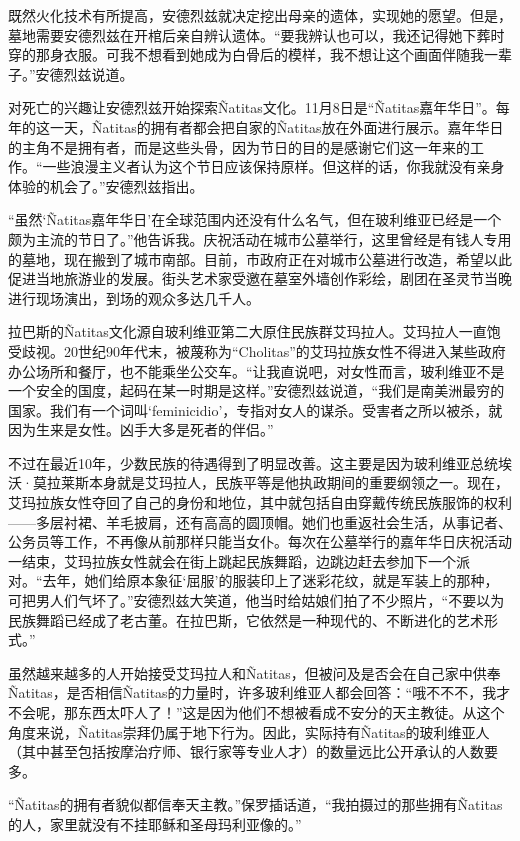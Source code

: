 \documentclass[12pt,oneside]{book}
\begin{document}
\begin{bookref}[frametitle={\cite{好好告别}}]
既然火化技术有所提高，安德烈兹就决定挖出母亲的遗体，实现她的愿望。但是，墓地需要安德烈兹在开棺后亲自辨认遗体。“要我辨认也可以，我还记得她下葬时穿的那身衣服。可我不想看到她成为白骨后的模样，我不想让这个画面伴随我一辈子。”安德烈兹说道。

对死亡的兴趣让安德烈兹开始探索Ñatitas文化。11月8日是“Ñatitas嘉年华日”。每年的这一天，Ñatitas的拥有者都会把自家的Ñatitas放在外面进行展示。嘉年华日的主角不是拥有者，而是这些头骨，因为节日的目的是感谢它们这一年来的工作。“一些浪漫主义者认为这个节日应该保持原样。但这样的话，你我就没有亲身体验的机会了。”安德烈兹指出。

“虽然‘Ñatitas嘉年华日’在全球范围内还没有什么名气，但在玻利维亚已经是一个颇为主流的节日了。”他告诉我。庆祝活动在城市公墓举行，这里曾经是有钱人专用的墓地，现在搬到了城市南部。目前，市政府正在对城市公墓进行改造，希望以此促进当地旅游业的发展。街头艺术家受邀在墓室外墙创作彩绘，剧团在圣灵节当晚进行现场演出，到场的观众多达几千人。

拉巴斯的Ñatitas文化源自玻利维亚第二大原住民族群艾玛拉人。艾玛拉人一直饱受歧视。20世纪90年代末，被蔑称为“Cholitas”的艾玛拉族女性不得进入某些政府办公场所和餐厅，也不能乘坐公交车。“让我直说吧，对女性而言，玻利维亚不是一个安全的国度，起码在某一时期是这样。”安德烈兹说道，“我们是南美洲最穷的国家。我们有一个词叫‘feminicidio’，专指对女人的谋杀。受害者之所以被杀，就因为生来是女性。凶手大多是死者的伴侣。”

不过在最近10年，少数民族的待遇得到了明显改善。这主要是因为玻利维亚总统埃沃·莫拉莱斯本身就是艾玛拉人，民族平等是他执政期间的重要纲领之一。现在，艾玛拉族女性夺回了自己的身份和地位，其中就包括自由穿戴传统民族服饰的权利——多层衬裙、羊毛披肩，还有高高的圆顶帽。她们也重返社会生活，从事记者、公务员等工作，不再像从前那样只能当女仆。每次在公墓举行的嘉年华日庆祝活动一结束，艾玛拉族女性就会在街上跳起民族舞蹈，边跳边赶去参加下一个派对。“去年，她们给原本象征‘屈服’的服装印上了迷彩花纹，就是军装上的那种，可把男人们气坏了。”安德烈兹大笑道，他当时给姑娘们拍了不少照片，“不要以为民族舞蹈已经成了老古董。在拉巴斯，它依然是一种现代的、不断进化的艺术形式。”

虽然越来越多的人开始接受艾玛拉人和Ñatitas，但被问及是否会在自己家中供奉Ñatitas，是否相信Ñatitas的力量时，许多玻利维亚人都会回答：“哦不不不，我才不会呢，那东西太吓人了！”这是因为他们不想被看成不安分的天主教徒。从这个角度来说，Ñatitas崇拜仍属于地下行为。因此，实际持有Ñatitas的玻利维亚人（其中甚至包括按摩治疗师、银行家等专业人才）的数量远比公开承认的人数要多。

“Ñatitas的拥有者貌似都信奉天主教。”保罗插话道，“我拍摄过的那些拥有Ñatitas的人，家里就没有不挂耶稣和圣母玛利亚像的。”


\end{bookref}
\end{document}
